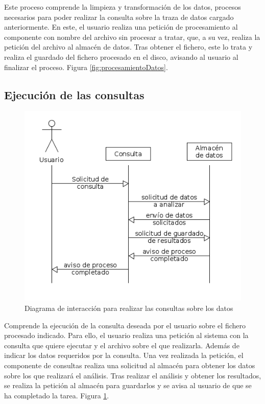 Este proceso comprende la limpieza y transformación de los datos, procesos necesarios para poder realizar la consulta sobre la traza de datos cargado anteriormente. En este, el usuario realiza una petición de procesamiento al componente con nombre del archivo sin procesar a tratar, que, a su vez, realiza la petición del archivo al almacén de datos. Tras obtener el fichero, este lo trata y realiza el guardado del fichero procesado en el disco, avisando al usuario al finalizar el proceso. Figura \ref{fig:procesamientoDatos}.

\subsection{Ejecución de las consultas}
\begin{figure}[htp!]
\centering
\caption{Diagrama de interacción para realizar las consultas sobre los datos}
\label{fig:consulta}
\includegraphics[scale=0.7]{diagramas/consulta}
\end{figure}

Comprende la ejecución de la consulta deseada por el usuario sobre el fichero procesado indicado. Para ello, el usuario realiza una petición al sistema con la consulta que quiere ejecutar y el archivo sobre el que realizarla. Además de indicar los datos requeridos por la consulta. Una vez realizada la petición, el componente de consultas realiza una solicitud al almacén para obtener los datos sobre los que realizará el análisis. Tras realizar el análisis y obtener los resultados, se realiza la petición al almacén para guardarlos y se avisa al usuario de que se ha completado la tarea. Figura \ref{fig:consulta}.


